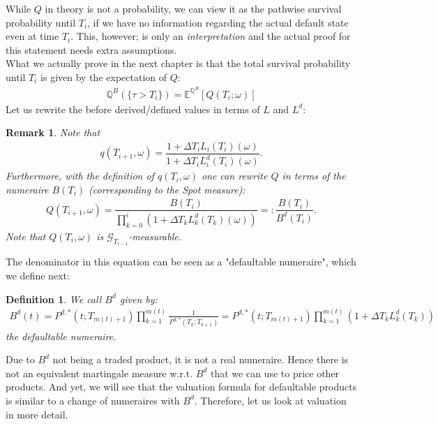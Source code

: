 \documentclass[12pt]{article}
\newtheorem{remark}[theorem]{Remark}
\newtheorem{definition}[theorem]{Definition}
\begin{document}
	While $Q$ in theory is not a probability, we can view it as the pathwise survival probability until $T_i$, if we have no information regarding the actual default state even at time $T_i$. This, however; is only an \emph{interpretation} and the actual proof for this statement needs extra assumptions.\\ %
	What we actually prove in the next chapter is that the total survival probability until $T_i$ is given by the expectation of $Q$:
	\begin{align*}
		\mathbb{Q}^B\left(\{\tau > T_i\}\right) = \mathbb{E}^{\mathbb{Q}^B} \left[Q(T_i;\omega)\right]
	\end{align*}
	Let us rewrite the before derived/defined values in terms of $L$ and $L^d$:
	\begin{remark}
		Note that 
		\begin{align*}
			q(T_{i+1}, \omega) = \dfrac{1 + \Delta  T_i L_i(T_i)(\omega)}{1 + \Delta  T_i L^d_i(T_i)(\omega)}.
		\end{align*}
		Furthermore, with the definition of $q(T_i, \omega)$ one can rewrite $Q$ in terms of the numeraire $B(T_i)$ (corresponding to the Spot measure):
		\begin{align*}
			Q\left( T_{i+1}, \omega \right) = \dfrac{B(T_i)}{\prod_{k=0}^{i}(1 + \Delta T_k L^d_k(T_k)(\omega))} =: \dfrac{B(T_i)}{B^d(T_i)}.
		\end{align*}
		Note that $Q(T_i, \omega)$ is $\mathcal{G}_{T_{i-1}}$-measurable.
	\end{remark}
	The denominator in this equation can be seen as a "defaultable numeraire", which we define next:
	\begin{definition}
		We call $B^d$ given by:
		\begin{align*}
			B^d(t) = P^{d,*}(t;T_{m(t)+1}) \prod_{k=1}^{m(t)}\frac{1}{P^{d,*}(T_k;T_{k+1})} = P^{d,*}(t;T_{m(t)+1}) \prod_{k=1}^{m(t)}(1+\Delta T_k L^d_k(T_k))
		\end{align*}
		the \emph{defaultable numeraire}. 
	\end{definition}
	Due to $B^d$ not being a traded product, it is not a real numeraire. Hence there is not an equivalent martingale measure w.r.t. $B^d$ that we can use to price other products. And yet, we will see that the valuation formula for defaultable products is similar to a change of numeraires with $B^d$. Therefore, let us look at valuation in more detail.
	
\end{document}
